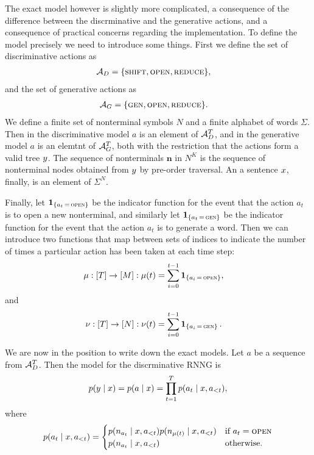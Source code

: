 The exact model however is slightly more complicated, a consequence of the difference between the discrminative and the generative actions, and a consequence of practical concerns regarding the implementation. To define the model precisely we need to introduce some things. First we define the set of discriminative actions as
\begin{align}
  \mathcal{A}_D &= \{ \textsc{shift}, \textsc{open}, \textsc{reduce} \},
\end{align}
and the set of generative actions as
\begin{align}
  \mathcal{A}_G &= \{ \textsc{gen}, \textsc{open}, \textsc{reduce} \}.
\end{align}
We define a finite set of nonterminal symbols $N$ and a finite alphabet of words $\Sigma$. Then in the discriminative model $a$ is an element of $\mathcal{A}_D^T$, and in the generative model $a$ is an elemtnt of $\mathcal{A}_G^T$, both with the restriction that the actions form a valid tree $y$. The sequence of nonterminals $\mathbf{n}$ in $N^K$ is the sequence of nonterminal nodes obtained from $y$ by pre-order traversal. An a sentence $x$, finally, is an element of $\Sigma^N$.

Finally, let $\operatorname{\mathbf{1}}_{ \{ a_t \, = \, \textsc{open} \} }$ be the indicator function for the event that the action $a_t$ is to open a new nonterminal, and similarly let $\operatorname{\mathbf{1}}_{ \{ a_t \, = \, \textsc{gen} \} }$ be the indicator function for the event that the action $a_t$ is to generate a word. Then we can introduce two functions that map between sets of indices to indicate the number of times a particular action has been taken at each time step:
\begin{align*}
  \mu &: [ T ] \to [ M ]: \mu(t) = \sum_{i=0}^{t-1} \operatorname{\mathbf{1}}_{ \{ a_i \, = \, \textsc{open} \} },
\end{align*}
and
\begin{align*}
  \nu &: [ T ] \to [ N ]: \nu(t) = \sum_{i=0}^{t-1} \operatorname{\mathbf{1}}_{ \{ a_i \, = \, \textsc{gen} \} }.
\end{align*}

We are now in the position to write down the exact models. Let $a$ be a sequence from $\mathcal{A}_D^T$. Then the model for the discrminative RNNG is
\begin{align}
  \label{eq:disc-model}
  p(y \mid x) = p(a \mid x) = \prod_{t=1}^T p( a_t \mid x, a_{<t}),
\end{align}
where
\begin{equation}
  \label{eq:disc-model}
  p( a_t \mid x, a_{<t}) =
  \begin{cases}
    p( n_{ a_t } \mid x, a_{<t} ) p( n_{ \mu(t) } \mid x, a_{<t} ) & \text{if } a_t = \textsc{open}  \\
    p( n_{ a_t } \mid x, a_{<t} ) & \text{otherwise.}  \\
  \end{cases}
\end{equation}

